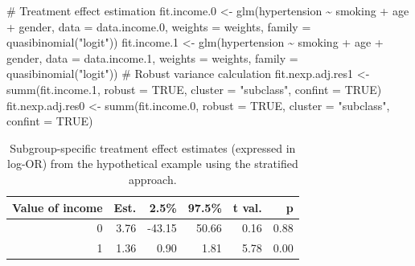 \documentclass[
  letterpaper,
  DIV=11,
  numbers=noendperiod]{scrreprt}
\newenvironment{Shaded}{\begin{snugshade}}{\end{snugshade}}
\newcommand{\AttributeTok}[1]{\textcolor[rgb]{0.40,0.45,0.13}{#1}}
\newcommand{\CommentTok}[1]{\textcolor[rgb]{0.37,0.37,0.37}{#1}}
\newcommand{\ConstantTok}[1]{\textcolor[rgb]{0.56,0.35,0.01}{#1}}
\newcommand{\FloatTok}[1]{\textcolor[rgb]{0.68,0.00,0.00}{#1}}
\newcommand{\FunctionTok}[1]{\textcolor[rgb]{0.28,0.35,0.67}{#1}}
\newcommand{\NormalTok}[1]{\textcolor[rgb]{0.00,0.23,0.31}{#1}}
\newcommand{\OtherTok}[1]{\textcolor[rgb]{0.00,0.23,0.31}{#1}}
\newcommand{\SpecialCharTok}[1]{\textcolor[rgb]{0.37,0.37,0.37}{#1}}
\newcommand{\StringTok}[1]{\textcolor[rgb]{0.13,0.47,0.30}{#1}}
\begin{document}
\begin{Shaded}
\begin{Highlighting}[]
\CommentTok{\# Treatment effect estimation}
\NormalTok{fit.income}\FloatTok{.0} \OtherTok{\textless{}{-}} \FunctionTok{glm}\NormalTok{(hypertension }\SpecialCharTok{\textasciitilde{}}\NormalTok{ smoking }\SpecialCharTok{+}\NormalTok{ age }\SpecialCharTok{+}\NormalTok{ gender, }
                   \AttributeTok{data =}\NormalTok{ data.income}\FloatTok{.0}\NormalTok{, }\AttributeTok{weights =}\NormalTok{ weights,}
                   \AttributeTok{family =} \FunctionTok{quasibinomial}\NormalTok{(}\StringTok{"logit"}\NormalTok{))}
\NormalTok{fit.income}\FloatTok{.1} \OtherTok{\textless{}{-}} \FunctionTok{glm}\NormalTok{(hypertension }\SpecialCharTok{\textasciitilde{}}\NormalTok{ smoking }\SpecialCharTok{+}\NormalTok{ age }\SpecialCharTok{+}\NormalTok{ gender, }
                   \AttributeTok{data =}\NormalTok{ data.income}\FloatTok{.1}\NormalTok{, }\AttributeTok{weights =}\NormalTok{ weights,}
                   \AttributeTok{family =} \FunctionTok{quasibinomial}\NormalTok{(}\StringTok{"logit"}\NormalTok{))}
\CommentTok{\# Robust variance calculation}
\NormalTok{fit.nexp.adj.res1 }\OtherTok{\textless{}{-}} \FunctionTok{summ}\NormalTok{(fit.income}\FloatTok{.1}\NormalTok{,  }
                          \AttributeTok{robust =} \ConstantTok{TRUE}\NormalTok{,}
                          \AttributeTok{cluster =} \StringTok{"subclass"}\NormalTok{,}
                          \AttributeTok{confint =} \ConstantTok{TRUE}\NormalTok{)}
\NormalTok{fit.nexp.adj.res0 }\OtherTok{\textless{}{-}} \FunctionTok{summ}\NormalTok{(fit.income}\FloatTok{.0}\NormalTok{, }
                          \AttributeTok{robust =} \ConstantTok{TRUE}\NormalTok{,}
                          \AttributeTok{cluster =} \StringTok{"subclass"}\NormalTok{,}
                          \AttributeTok{confint =} \ConstantTok{TRUE}\NormalTok{)}
\end{Highlighting}
\end{Shaded}

\hypertarget{tbl-stratified-approach}{}
\begin{table}[!h]
\caption{\label{tbl-stratified-approach}Subgroup-specific treatment effect estimates (expressed in log-OR) from
the hypothetical example using the stratified approach. }\tabularnewline

\centering
\begin{tabular}{rrrrrr}
\toprule
Value of income & Est. & 2.5\% & 97.5\% & t val. & p\\
\midrule
0 & 3.76 & -43.15 & 50.66 & 0.16 & 0.88\\
1 & 1.36 & 0.90 & 1.81 & 5.78 & 0.00\\
\bottomrule
\end{tabular}
\end{table}
\end{document}
